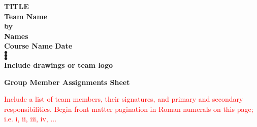 \documentclass[conf]{new-aiaa}
\begin{document}
\begin{titlepage}
    \begin{center}
        \vspace*{1cm}
        \large
        \textbf{TITLE} \\
        \vspace{0.5cm}
        \textbf{Team Name} \\
        \vspace{0.5cm}
        \normalsize
        \textbf{by} \\
        \vspace{0.5cm}
        \textbf{Names} \\
        \vspace{0.5cm}
        \textbf{Course Name}
        \vspace{0.5cm}
        \textbf{Date} \\
        \vspace{2.5cm}
        $\bullet$\\
        \vspace{2.5cm}
        $\bullet$\\
        \vspace{2.5cm}
        $\bullet$\\
        \vspace{1.75cm}
        \textbf{Include drawings or team logo}
    \end{center}
\end{titlepage}

\newpage
\begin{center}
    \Large{\textbf{Group Member Assignments Sheet}}
\end{center}

\textcolor{red}{Include  a  list  of  team  members,  their  signatures,  and  primary  and  secondary  responsibilities.  Begin front matter pagination in Roman numerals on this page; i.e. i, ii, iii, iv, ...}
\newpage

\tableofcontents

\newpage
\end{document}
